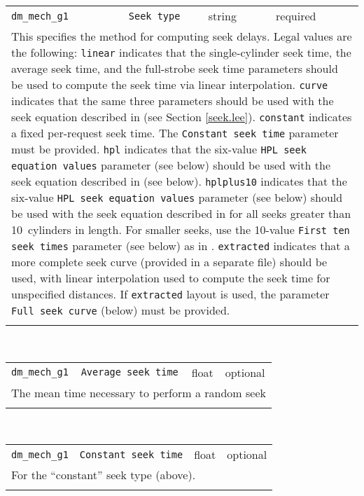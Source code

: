 \begin{tabular}{|p{1.5in}|p{3.5in}|p{0.5in}|p{0.5in}|}
\cline{1-4}
\texttt{dm\_mech\_g1} & \texttt{Seek type} & string & required \\ 
\cline{1-4}
\multicolumn{4}{|p{6in}|}{
This specifies the method for computing seek delays.
Legal values are the following:
\texttt{linear} indicates that the single-cylinder seek time, the average
seek time, and the full-strobe seek time parameters should be used to
compute the seek time via linear interpolation.
\texttt{curve} indicates that the same three parameters should be used
with the seek equation described in \cite{Lee93} (see Section
\ref{seek.lee}).
\texttt{constant} indicates a fixed per-request seek time. The
\texttt{Constant seek time} parameter must be provided.
\texttt{hpl} indicates that the six-value \texttt{HPL seek equation values}
parameter (see below) should be used with the seek equation described
in \cite{Ruemmler94} (see below).
\texttt{hplplus10} indicates that the six-value \texttt{HPL seek
equation values} parameter (see below) should be used with the seek
equation described in \cite{Ruemmler94} for all seeks greater than
10~cylinders in length. For smaller seeks, use the 10-value
\texttt{First ten seek times} parameter (see below) as in
\cite{Worthington94}.
\texttt{extracted} indicates that a more complete seek curve (provided
in a separate file) should be used, with linear interpolation used to
compute the seek time for unspecified distances. If
\texttt{extracted} layout is used, the parameter \texttt{Full seek curve}
(below) must be provided.
}\\ 
\cline{1-4}
\multicolumn{4}{p{5in}}{}\\
\end{tabular}\\ 
\noindent 
\begin{tabular}{|p{1.5in}|p{3.5in}|p{0.5in}|p{0.5in}|}
\cline{1-4}
\texttt{dm\_mech\_g1} & \texttt{Average seek time} & float & optional \\ 
\cline{1-4}
\multicolumn{4}{|p{6in}|}{
The mean time necessary to perform a random seek
}\\ 
\cline{1-4}
\multicolumn{4}{p{5in}}{}\\
\end{tabular}\\ 
\noindent 
\begin{tabular}{|p{1.5in}|p{3.5in}|p{0.5in}|p{0.5in}|}
\cline{1-4}
\texttt{dm\_mech\_g1} & \texttt{Constant seek time} & float & optional \\ 
\cline{1-4}
\multicolumn{4}{|p{6in}|}{
For the ``constant'' seek type (above).
}\\ 
\cline{1-4}
\multicolumn{4}{p{5in}}{}\\
\end{tabular}\\ 
